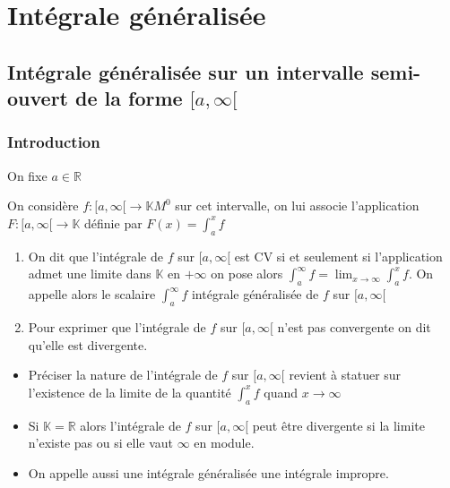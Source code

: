 \documentclass[11pt,hidelinks]{book}
\theoremstyle{mytheoremstyle}
\theoremstyle{mytheoremstyle}
\theoremstyle{mytheoremstyle}
\theoremstyle{mytheoremstyle}
\theoremstyle{mytheoremstyle}
\theoremstyle{mytheoremstyle}
\theoremstyle{mytheoremstyle}
\theoremstyle{mytheoremstyle}
\theoremstyle{myproblemstyle}
\def\mbb#1{\mathbb{#1}}
\def\bR{\mbb{R}}
\def\bK{\mbb{K}}
\def\af{[a,\infty[}
\newcommand{\func}[3]{#1\colon#2\to#3}
\begin{document}
\chapter{Intégrale généralisée}
\section{Intégrale généralisée sur un intervalle semi-ouvert de la forme $[a,\infty[$}
\subsection{Introduction} On fixe $a \in \bR$
\begin{definition}
    On considère $\func{f}{[a,\infty[}{\bK} M^0$ sur cet intervalle, on 
    lui associe l'application $\func{F}{\af}{\bK}$ définie par $F(x) = \int_a^x f$ 
    \begin{enumerate} 
    \item On dit que l'intégrale de $f$ sur $\af$ est CV si et seulement si
    l'application admet une limite dans $\bK$ en $+\infty$ on pose alors 
    $\int_a^{\infty} f = \lim_{x \to \infty} \int_a^x f$. On appelle alors le scalaire $\int_a^{\infty} f$ 
    intégrale généralisée de $f$ sur $\af$ 

    \item Pour exprimer que l'intégrale de $f$ sur $\af$ n'est pas convergente on 
    dit qu'elle est divergente.
    \end{enumerate}
\end{definition}
\begin{rmq}
    \begin{itemize}
        \item Préciser la nature de l'intégrale de $f$ sur $\af$ revient 
        à statuer sur l'existence de la limite de la quantité $\int_a^x f$ quand $x \to \infty$
        \item Si $\bK = \bR$ alors l'intégrale de $f$ sur $\af$ peut être divergente si la limite 
        n'existe pas ou si elle vaut $\infty$ en module.
        \item On appelle aussi une intégrale généralisée une intégrale impropre.
    \end{itemize}
\end{rmq}
\end{document}
